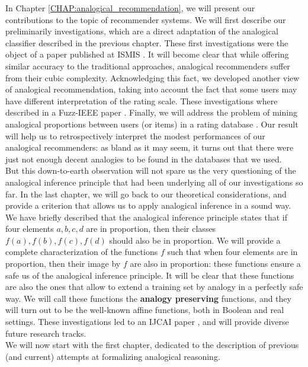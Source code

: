 In Chapter \ref{CHAP:analogical_recommendation}, we will present our
contributions to the topic of recommender systems. We will first describe our
preliminarily investigations, which are a direct adaptation of the analogical
classifier described in the previous chapter. These first investigations were
the object of a paper published at ISMIS \cite{HugPraRicISMIS15}. It will
become clear that while offering similar accuracy to the traditional
approaches, analogical recommenders suffer from their cubic complexity.
Acknowledging this fact, we developed another view of analogical
recommendation, taking into account the fact that some users may have different
interpretation of the rating scale. These investigations where described in a
Fuzz-IEEE paper \cite{HugPraRicSerFuzzIEEE16}. Finally, we will address the
problem of mining analogical proportions between users (or items) in a rating
database \cite{HugPraRicSerLFA16}. Our result will help us to retrospectively
interpret the modest performances of our analogical recommenders: as bland as
it may seem, it turns out that there were just not enough decent analogies to
be found in the databases that we used.\\

But this down-to-earth observation will not spare us the very questioning of
the analogical inference principle that had been underlying all of our
investigations so far. In the last chapter, we will go back to our theoretical
considerations, and provide a criterion that allows us to apply analogical
inference in a sound way. We have briefly described that the analogical
inference principle states that if four elements $a, b, c, d$ are in
proportion, then their classes $f(a), f(b), f(c), f(d)$ should also be in
proportion. We will provide a complete characterization of the functions $f$
such that when four elements are in proportion, then their image by $f$ are
also in proportion: these functions ensure a safe us of the analogical
inference principle. It will be clear that these functions are also the ones
that allow to extend a training set by analogy in a perfectly safe way. We will
call these functions the \textbf{analogy preserving} functions, and they will
turn out to be the well-known affine functions, both in Boolean and real
settings. These investigations led to an IJCAI paper
\cite{CouHugPraRicIJCAI17}, and will provide diverse future research tracks.\\


We will now start with the first chapter, dedicated to the description of
previous (and current) attempts at formalizing analogical reasoning.
